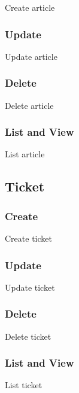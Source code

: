 Create article

\subsubsection{Update}
\label{ch:result:user_guide:article:update}

Update article

\subsubsection{Delete}
\label{ch:result:user_guide:article:delete}

Delete article

\subsubsection{List and View}
\label{ch:result:user_guide:article:list}

List article

\subsection{Ticket}
\label{ch:result:user_guide:ticket}
\subsubsection{Create}
\label{ch:result:user_guide:ticket:create}

Create ticket

\subsubsection{Update}
\label{ch:result:user_guide:ticket:update}

Update ticket

\subsubsection{Delete}
\label{ch:result:user_guide:ticket:delete}

Delete ticket

\subsubsection{List and View}
\label{ch:result:user_guide:ticket:list}

List ticket


